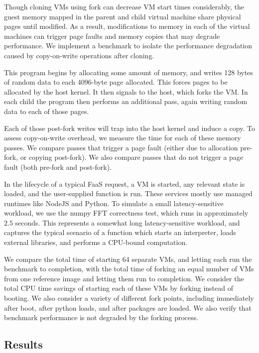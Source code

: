  Though cloning VMs using fork can decrease VM start
times considerably, the guest memory mapped in the parent and child virtual
machine share physical pages until modified. As a result, modifications to
memory in each of the virtual machines can trigger page faults and memory
copies that may degrade performance. We implement a benchmark to isolate the
performance degradation caused by copy-on-write operations after cloning.

This program begins by allocating some amount of memory, and writes 128 bytes
of random data to each 4096-byte page allocated. This forces pages to be
allocated by the host kernel. It then signals to the host, which forks the VM.
In each child the program then performs an additional pass, again writing
random data to each of those pages.

Each of those post-fork writes will trap into the host kernel and induce a
copy. To assess copy-on-write overhead, we measure the time for each of these
memory passes. We compare passes that trigger a page fault (either due to
allocation pre-fork, or copying post-fork). We also compare passes that do not
trigger a page fault (both pre-fork and post-fork).

 In the lifecycle of a typical FaaS request, a VM is
started, any relevant state is loaded, and the user-supplied function is run.
These services mostly use managed runtimes like NodeJS and Python. To simulate
a small latency-sensitive workload, we use the numpy FFT correctness test,
which runs in approximately $2.5$ seconds. This represents a somewhat long
latency-sensitive workload, and captures the typical scenario of a function
which starts an interpreter, loads external libraries, and performs a CPU-bound
computation.

We compare the total time of starting 64 separate VMs, and letting each run the
benchmark to completion, with the total time of forking an equal number of VMs
from one reference image and letting them run to completion. We consider the
total CPU time savings of starting each of these VMs by forking instead of
booting. We also consider a variety of different fork points, including
immediately after boot, after python loads, and after packages are loaded. We
also verify that benchmark performance is not degraded by the forking process.

\subsection{Results}

